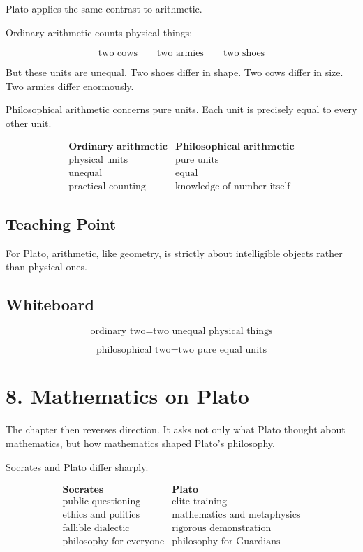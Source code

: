 \documentclass[11pt]{article}
\begin{document}
Plato applies the same contrast to arithmetic.

Ordinary arithmetic counts physical things:

\[
\text{two cows}
\qquad
\text{two armies}
\qquad
\text{two shoes}
\]

But these units are unequal. Two shoes differ in shape. Two cows differ in size. Two armies
differ enormously.

Philosophical arithmetic concerns pure units. Each unit is precisely equal to every other
unit.

\[
\begin{array}{c|c}
\textbf{Ordinary arithmetic} & \textbf{Philosophical arithmetic} \\
\hline
\text{physical units} & \text{pure units} \\
\text{unequal} & \text{equal} \\
\text{practical counting} & \text{knowledge of number itself}
\end{array}
\]

\subsection*{Teaching Point}

For Plato, arithmetic, like geometry, is strictly about intelligible objects rather than physical
ones.

\subsection*{Whiteboard}

\[
\text{ordinary two}
=
\text{two unequal physical things}
\]

\[
\text{philosophical two}
=
\text{two pure equal units}
\]

\section*{8. Mathematics on Plato}

The chapter then reverses direction. It asks not only what Plato thought about
mathematics, but how mathematics shaped Plato's philosophy.

Socrates and Plato differ sharply.

\[
\begin{array}{c|c}
\textbf{Socrates} & \textbf{Plato} \\
\hline
\text{public questioning} & \text{elite training} \\
\text{ethics and politics} & \text{mathematics and metaphysics} \\
\text{fallible dialectic} & \text{rigorous demonstration} \\
\text{philosophy for everyone} & \text{philosophy for Guardians}
\end{array}
\]
\end{document}

